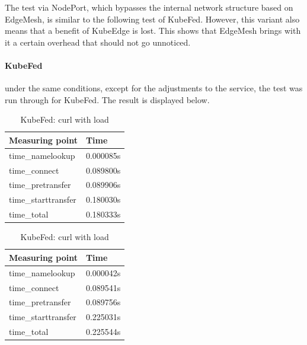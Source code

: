 \documentclass[MIC,Master,english]{twbook}%
\begin{document}
The test via NodePort, which bypasses the internal network structure based on EdgeMesh, is similar to the following test of KubeFed. However, this variant also means that a benefit of KubeEdge is lost. This shows that EdgeMesh brings with it a certain overhead that should not go unnoticed.

\paragraph{KubeFed} under the same conditions, except for the adjustments to the service, the test was run through for KubeFed. The result is displayed below.

\begin{table}[ht]
    \begin{center}
        \begin{minipage}{.49\linewidth}
            \begin{center}
                \begin{tabular}{|l|l|}
                    \hline
                    Measuring point & Time \\
                    \hline
                    time\_namelookup & 0.000085s \\
                    time\_connect & 0.089800s \\
                    time\_pretransfer & 0.089906s \\
                    time\_starttransfer & 0.180030s \\
                    \hline
                    time\_total & 0.180333s \\
                    \hline
                \end{tabular}
                \caption{KubeFed: curl without load}
                \label{tab:kf-con-noload}
            \end{center}
        \end{minipage}
        \begin{minipage}{.49\linewidth}
            \begin{center}
                \begin{tabular}{|l|l|}
                    \hline
                    Measuring point & Time \\
                    \hline
                    time\_namelookup & 0.000042s \\
                    time\_connect & 0.089541s \\
                    time\_pretransfer & 0.089756s \\
                    time\_starttransfer & 0.225031s \\
                    \hline
                    time\_total & 0.225544s \\
                    \hline
                \end{tabular}
                \caption{KubeFed: curl with load}
                \label{tab:kf-con-load}
            \end{center}
        \end{minipage}
    \end{center}
\end{table}
\end{document}
